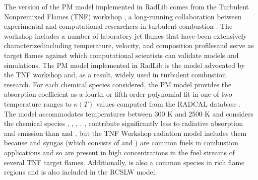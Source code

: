 \documentclass[preprint,12pt]{elsarticle}
\begin{document}
The version of the PM model implemented in RadLib comes from the Turbulent Nonpremixed Flames (TNF) workshop \cite{TNF}, a long-running collaboration between experimental and computational researchers in turbulent combustion \citep{Smith_2003,Barlow_2001}. The workshop includes a number of laboratory jet flames that have been extensively characterized\textemdash including temperature, velocity, and composition profiles\textemdash and serve as target flames against which computational scientists can validate models and simulations.
The PM model implemented in RadLib is the model advocated by the TNF workshop and, as a result, widely used in turbulent combustion research.
For each chemical species considered, the PM model provides the absorption coefficient as a fourth or fifth order polynomial fit in one of two temperature ranges to $\kappa(T)$ values computed from the RADCAL database \cite{Grosshandler_1993}.
The model accommodates temperatures between 300 K and 2500 K and considers the chemical species , , , .
,  contribute significantly less to radiative absorption and emission than  and , but the TNF Workshop radiation model includes them because  and syngas (which consists of  and ) are common fuels in combustion applications and so are present in high concentrations in the fuel streams of several TNF target flames. Additionally,  is also a common species in rich flame regions and is also included in the RCSLW model.
\end{document}
